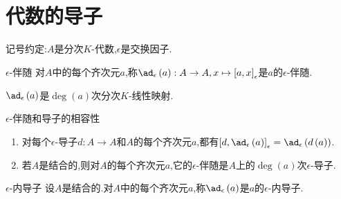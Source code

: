 \section{代数的导子}

记号约定:$A$是分次$K$-代数,$\epsilon$是交换因子.

\begin{definition}{$\epsilon$-伴随}{}
	对$A$中的每个齐次元$a$,称$\ad_{\epsilon}\left(a\right):A\to A,x\mapsto\left[a,x\right]_{\epsilon}$是$a$的$\epsilon$-伴随.
\end{definition}

\begin{remark}{}{}
	$\ad_{\epsilon}\left(a\right)$是$\deg\left(a\right)$次分次$K$-线性映射.
\end{remark}

\begin{proposition}{$\epsilon$-伴随和导子的相容性}{}
	\begin{enumerate}
		\item 对每个$\epsilon$-导子$d:A\to A$和$A$的每个齐次元$a$,都有$\left[d,\ad_{\epsilon}\left(a\right)\right]_{\epsilon}=\ad_{\epsilon}\left(d\left(a\right)\right)$.
		\item 若$A$是结合的,则对$A$的每个齐次元$a$,它的$\epsilon$-伴随是$A$上的$\deg\left(a\right)$次$\epsilon$-导子.
	\end{enumerate}
\end{proposition}

\begin{definition}{$\epsilon$-内导子}{}
	设$A$是结合的.对$A$中的每个齐次元$a$,称$\ad_{\epsilon}\left(a\right)$是$a$的$\epsilon$-内导子.
\end{definition}

